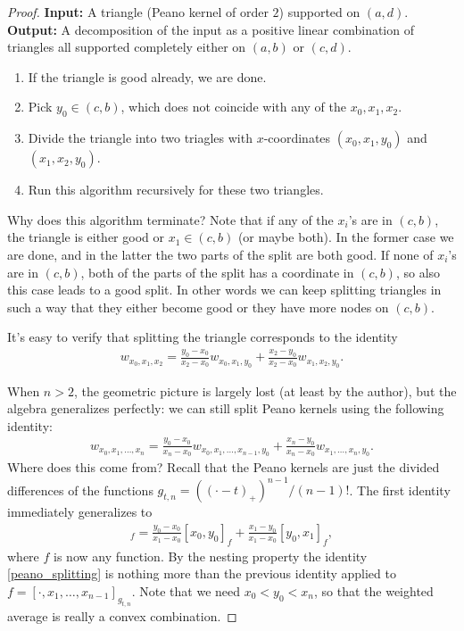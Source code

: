 \begin{proof}
	\noindent \textbf{Input:} A triangle (Peano kernel of order $2$) supported on $(a, d)$. \\
	\noindent \textbf{Output:} A decomposition of the input as a positive linear combination of triangles all supported completely either on $(a, b)$ or $(c, d)$.
	\begin{enumerate}
		\item If the triangle is good already, we are done.
		\item Pick $y_{0} \in (c, b)$, which does not coincide with any of the $x_{0}, x_{1}, x_{2}$.
		\item Divide the triangle into two triagles with $x$-coordinates $(x_{0}, x_{1}, y_{0})$ and $(x_{1}, x_{2},  y_{0})$.
		\item Run this algorithm recursively for these two triangles.
	\end{enumerate}
	Why does this algorithm terminate? Note that if any of the $x_{i}$'s are in $(c, b)$, the triangle is either good or $x_{1} \in (c, b)$ (or maybe both). In the former case we are done, and in the latter the two parts of the split are both good. If none of $x_{i}$'s are in $(c, b)$, both of the parts of the split has a coordinate in $(c, b)$, so also this case leads to a good split. In other words we can keep splitting triangles in such a way that they either become good or they have more nodes on $(c, b)$.

	It's easy to verify that splitting the triangle corresponds to the identity
	\begin{align*}
		w_{x_{0}, x_{1}, x_{2}} = \frac{y_{0} - x_{0}}{x_{2} - x_{0}} w_{x_{0}, x_{1}, y_{0}} + \frac{x_{2} - y_{0}}{x_{2} - x_{0}} w_{x_{1}, x_{2}, y_{0}}.
	\end{align*}

	When $n > 2$, the geometric picture is largely lost (at least by the author), but the algebra generalizes perfectly: we can still split Peano kernels using the following identity:
	\begin{align}\label{peano_splitting}
		w_{x_{0}, x_{1}, \ldots, x_{n}} = \frac{y_{0} - x_{0}}{x_{n} - x_{0}} w_{x_{0}, x_{1}, \ldots, x_{n - 1}, y_{0}} + \frac{x_{n} - y_{0}}{x_{n} - x_{0}} w_{x_{1}, \ldots, x_{n}, y_{0}}.
	\end{align}
	Where does this come from? Recall that the Peano kernels are just the divided differences of the functions $g_{t, n} = ((\cdot - t)_{+})^{n - 1}/(n - 1)!$. The first identity immediately generalizes to
	\begin{align*}
		[x_{0}, x_{1}]_{f} = \frac{y_{0} - x_{0}}{x_{1} - x_{0}} [x_{0}, y_{0}]_{f} + \frac{x_{1} - y_{0}}{x_{1} - x_{0}} [y_{0}, x_{1}]_{f},
	\end{align*}
	where $f$ is now any function. By the nesting property the identity \ref{peano_splitting} is nothing more than the previous identity applied to $f = [\cdot, x_{1}, \ldots, x_{n - 1}]_{g_{t, n}}$. Note that we need $x_{0} < y_{0} < x_{n}$, so that the weighted average is really a convex combination.


\end{proof}
